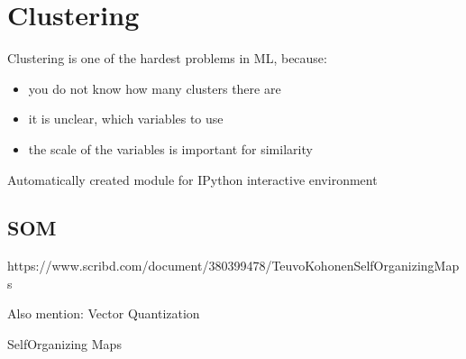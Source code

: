 \documentclass[letterpaper,10pt,english]{jupyterBook}
\begin{document}
\chapter{Clustering}
\label{\detokenize{Text_Clustering:clustering}}\label{\detokenize{Text_Clustering::doc}}
\sphinxAtStartPar
Clustering is one of the hardest problems in ML, because:
\begin{itemize}
\item {} 
\sphinxAtStartPar
you do not know how many clusters there are

\item {} 
\sphinxAtStartPar
it is unclear, which variables to use

\item {} 
\sphinxAtStartPar
the scale of the variables is important for similarity

\end{itemize}

\begin{sphinxVerbatim}[commandchars=\\\{\}]
Automatically created module for IPython interactive environment
\end{sphinxVerbatim}

\noindent{}

\noindent{}


\section{SOM}
\label{\detokenize{Text_Clustering:som}}
\sphinxAtStartPar
https://www.scribd.com/document/380399478/Teuvo\sphinxhyphen{}Kohonen\sphinxhyphen{}Self\sphinxhyphen{}Organizing\sphinxhyphen{}Maps

\sphinxAtStartPar
Also mention: Vector Quantization

\sphinxAtStartPar
{} Self\sphinxhyphen{}Organizing Maps

\noindent{}

\noindent{}

\sphinxAtStartPar
{}



\sphinxAtStartPar
{}

\noindent{}
\end{document}
